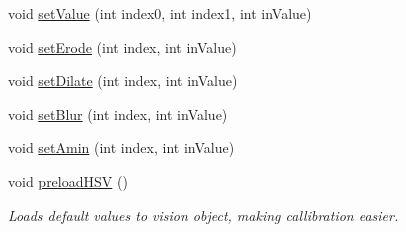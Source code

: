 \begin{DoxyCompactItemize}
void \hyperlink{class_vision_a43213a295e6e199c261d141118be14ad}{set\+Value} (int index0, int index1, int in\+Value)
\item 
void \hyperlink{class_vision_a1313404c61d1518f8b8cb354377ed5f1}{set\+Erode} (int index, int in\+Value)
\item 
void \hyperlink{class_vision_a5a763aa322837556ab83f39ffb7e9391}{set\+Dilate} (int index, int in\+Value)
\item 
void \hyperlink{class_vision_aa40b48aebdf61dfda490fbc2620d2ac3}{set\+Blur} (int index, int in\+Value)
\item 
void \hyperlink{class_vision_a15483736197991fac542022fd9652472}{set\+Amin} (int index, int in\+Value)
\item 
void \hyperlink{class_vision_ac0c3f793197c5fec6dddb22ff7c7383c}{preload\+H\+SV} ()
\begin{DoxyCompactList}\small\item\em Loads default values to vision object, making callibration easier. \end{DoxyCompactList}\end{DoxyCompactItemize}
